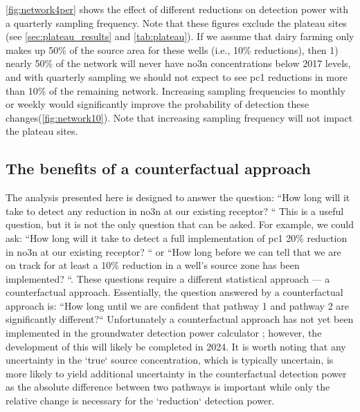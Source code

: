 \autoref{fig:network4per} shows the effect of different reductions on detection power with a quarterly sampling frequency. Note that these figures exclude the plateau sites (see \autoref{sec:plateau_results} and \autoref{tab:plateau}). If we assume that dairy farming only makes up 50\% of the source area for these wells (i.e., 10\% reductions), then 1) nearly 50\% of the network will never have \gls{no3n} concentrations below 2017 levels, and with quarterly sampling we should not expect to see \gls{pc1} reductions in more than 10\% of the remaining network. Increasing sampling frequencies to monthly or weekly would significantly improve the probability of detection these changes(\autoref{fig:network10}).  Note that increasing sampling frequency will not impact the plateau sites.

\subsection[counterfactual approach]{The benefits of a counterfactual approach} \label{sec:counterfactual}

The analysis presented here is designed to answer the question: ``How long will it take to detect any reduction in \gls{no3n} at our existing receptor? `` This is a useful question, but it is not the only question that can be asked. For example, we could ask: ``How long will it take to detect a full implementation of \gls{pc1} 20\% reduction in \gls{no3n} at our existing receptor? `` or ``How long before we can tell that we are on track for at least a 10\% reduction in a well's source zone has been implemented? ``. %
These questions require a different statistical approach --- a counterfactual approach. Essentially, the question answered by a counterfactual approach is: ``How long until we are confident that pathway 1 and pathway 2 are significantly different?`` Unfortunately a counterfactual approach has not yet been implemented in the groundwater detection power calculator %
; however, the development of this will likely be completed in 2024. It is worth noting that any uncertainty in the `true` source concentration, which is typically uncertain, is more likely to yield additional uncertainty in the counterfactual detection power as the absolute difference between two pathways is important while only the relative change is necessary for the `reduction` detection power.

